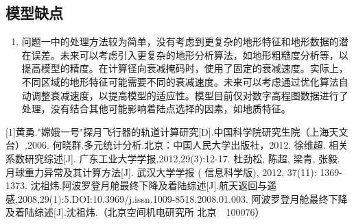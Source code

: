 \documentclass{ctexart}
\begin{document}
\subsection{模型缺点}
\begin{enumerate}[(1)]
    \item 问题一中的处理方法较为简单，没有考虑到更复杂的地形特征和地形数据的潜在误差。未来可以考虑引入更复杂的地形分析算法，如地形粗糙度分析等，以提高模型的精度。在计算径向衰减掩码时，使用了固定的衰减速度。实际上，不同区域的地形特征可能需要不同的衰减速度。未来可以考虑通过优化算法自动调整衰减速度，以提高模型的适应性。模型目前仅对数字高程图数据进行了处理，没有结合其他可能影响着陆点选择的因素，如地质特征。
\end{enumerate}


    \begin{thebibliography}{9} %
		[1]黄勇."嫦娥一号"探月飞行器的轨道计算研究[D].中国科学院研究生院（上海天文台）,2006.
		何晓群.多元统计分析.北京：中国人民大学出版社，2012.
		徐维超. 相关系数研究综述[J]. 广东工业大学学报,2012,29(3):12-17.
		杜劲松, 陈超, 梁青, 张毅. 月球重力异常及其计算方法[J]. 武汉大学学报 ( 信息科学版), 2012, 37(11): 1369-1373.
		沈祖炜.阿波罗登月舱最终下降及着陆综述[J].航天返回与遥感,2008,29(1):5.DOI:10.3969/j.issn.1009-8518.2008.01.003.
		阿波罗登月舱最终下降及着陆综述[J].沈祖炜.（北京空间机电研究所 北京　100076）

    \end{thebibliography}

    \newpage
\end{document}
